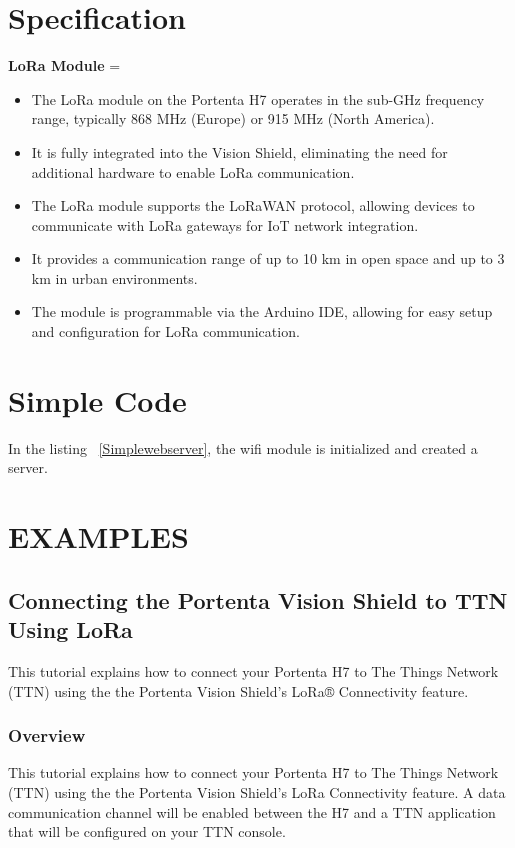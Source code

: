 \section{Specification}
\textbf{LoRa Module} =  

\begin{itemize}
	
	\item The LoRa module on the Portenta H7 operates in the sub-GHz frequency range, typically 868 MHz (Europe) or 915 MHz (North America).
	\item It is fully integrated into the Vision Shield, eliminating the need for additional hardware to enable LoRa communication.
	\item The LoRa module supports the LoRaWAN protocol, allowing devices to communicate with LoRa gateways for IoT network integration.
	\item It provides a communication range of up to 10 km in open space and up to 3 km in urban environments.
	\item The module is programmable via the Arduino IDE, allowing for easy setup and configuration for LoRa communication. \cite{connecting_to_ttn_portenta_vision_shield:2024}
	
\end{itemize}


\section{Simple Code}
In the listing  ~\ref{Simplewebserver}, the wifi module is initialized and created a server.

{
	\label{Simplewebserver}
}



\section{EXAMPLES}

\subsection{Connecting the Portenta Vision Shield to TTN Using LoRa}
This tutorial explains how to connect your Portenta H7 to The Things Network (TTN) using the the Portenta Vision Shield's LoRa® Connectivity feature. \cite{connecting_to_ttn_portenta_vision_shield:2024}

\subsubsection{Overview}
This tutorial explains how to connect your Portenta H7 to The Things Network (TTN) using the the Portenta Vision Shield's LoRa Connectivity feature. A data communication channel will be enabled between the H7 and a TTN application that will be configured on your TTN console. \cite{connecting_to_ttn_portenta_vision_shield:2024}

